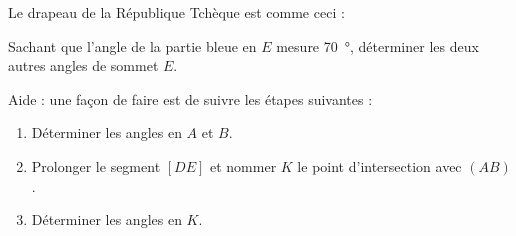 
\begin{exercice}\label{exo2smath-0167}

    Le drapeau de la République Tchèque est comme ceci :
    \begin{center}

    \end{center}
    Sachant que l'angle de la partie bleue en \( E\) mesure \SI{70}{\degree}, déterminer les deux autres angles de sommet \( E\).
    
    Aide : une façon de faire est de suivre les étapes suivantes :
    \begin{enumerate}
        \item
            Déterminer les angles en \( A\) et \( B\).
        \item
            Prolonger le segment \( [DE]\) et nommer \( K\) le point d'intersection avec \( (AB)\).
        \item
            Déterminer les angles en \( K\).
    \end{enumerate}
    
\end{exercice}
